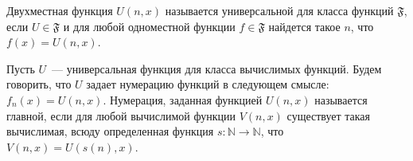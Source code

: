 Двухместная функция $U(n, x)$ называется универсальной для класса функций $\mathfrak{F}$, если $U \in \mathfrak{F}$ и для
любой одноместной функции $f \in \mathfrak{F}$ найдется такое $n$, что $f(x) = U(n, x)$.

Пусть $U$~--- универсальная функция для класса вычислимых функций. Будем говорить, что $U$ задает нумерацию функций в
следующем смысле: $f_n(x) = U(n, x)$. Нумерация, заданная функцией $U(n, x)$ называется главной, если для любой вычислимой
функции $V(n, x)$ существует такая вычислимая, всюду определенная функция $s: \mathbb{N} \to \mathbb{N}$, что $V(n, x) =
U(s(n), x)$.